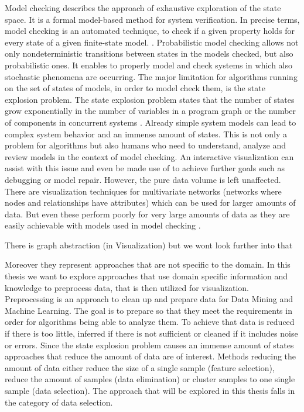 \documentclass[preview]{standalone}
\begin{document}
Model checking describes the approach of exhaustive exploration of the state space. It is a formal model-based method for system verification. In precise terms, model checking is an automated technique, to check if a given property holds for every state of a given finite-state model. \cite[chs. 1.1 and 1.2]{Baier2008}. Probabilistic model checking allows not only nondeterministic transitions between states in the models checked, but also probabilistic ones. It enables to properly model and check systems in which also stochastic phenomena are occurring. The major limitation for algorithms running on the set of states of models, in order to model check them, is the state explosion problem. The state explosion problem states that the number of states grow exponentially in the number of variables in a program graph or the number of components in concurrent systems \cite[ch. 2.3]{Baier2008}. Already simple system models can lead to complex system behavior and an immense amount of states. This is not only a problem for algorithms but also humans who need to understand, analyze and review models in the context of model checking. An interactive visualization can assist with this issue and even be made use of to achieve further goals such as debugging or model repair. However, the pure data volume is left unaffected. There are visualization techniques  for multivariate networks (networks where nodes and relationships have attributes) which can be used for larger amounts of data. But even these perform poorly for very large amounts of data as they are easily achievable with models used in model checking \cite{Kerren2014,Nobre2019}. 

There is graph abstraction (in Visualization) but we wont look further into that 

Moreover they represent approaches that are not specific to the domain. In this thesis we want to explore approaches that use domain specific information and knowledge to preprocess data, that is then utilized for visualization. Preprocessing is an approach to clean up and prepare data for Data Mining and Machine Learning. The goal is to prepare so that they meet the requirements in order for algorithms being able to analyze them. To achieve that data is reduced if there is too little, inferred if there is not sufficient or cleaned if it includes noise or errors. Since the state explosion problem causes an immense amount of states approaches that reduce the amount of data are of interest. Methods reducing the amount of data either reduce the size of a single sample (feature selection), reduce the amount of samples (data elimination) or cluster samples to one single sample (data selection)\cite{Famili1997,Garcia2016}. The approach that will be explored in this thesis falls in the category of data selection. 
\end{document}
